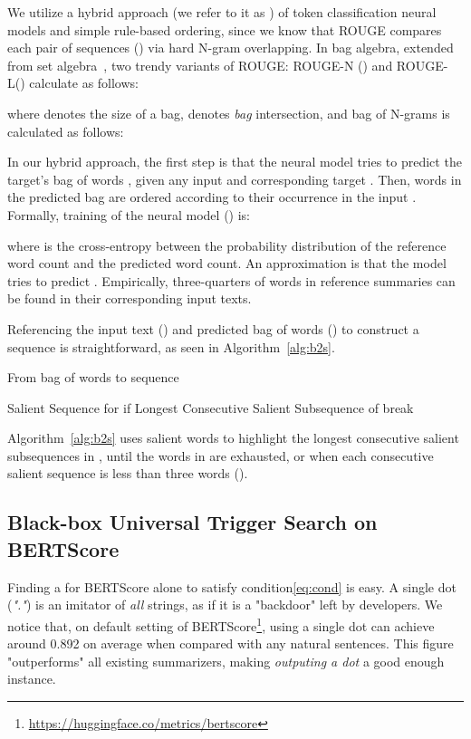 \documentclass[11pt]{article}
\theoremstyle{remark}
\begin{document}
We utilize a hybrid approach (we refer to it as ) of token classification neural models and simple rule-based ordering, since we know that ROUGE compares each pair of sequences () via hard N-gram overlapping. In bag algebra, extended from set algebra~\cite{bertossi2018datalog}, two trendy variants of ROUGE: ROUGE-N () and ROUGE-L() calculate as follows:



where  denotes the size of a bag,  denotes  \emph{bag} intersection, and bag of N-grams is calculated as follows:



In our hybrid approach, the first step is that the neural model tries to predict the target's bag of words , given any input  and corresponding target . Then, words in the predicted bag are ordered according to their occurrence in the input . Formally, training of the neural model () is:




where  is the cross-entropy between the probability distribution of the reference word count and the predicted word count. An approximation is that the model tries to predict . Empirically, three-quarters of words in reference summaries can be found in their corresponding input texts.

Referencing the input text () and predicted bag of words () to construct a sequence is straightforward, as seen in Algorithm~\ref{alg:b2s}.


\begin{algorithm}
\caption{From bag of words to sequence}\label{alg:b2s}
\small
\begin{algorithmic}
\Require 
\Return 
\State 
\While{}
\State Salient Sequence  for  if 
\State  Longest Consecutive Salient Subsequence of 
\If{} 
\State break 
\EndIf
\State  {}
\State  {}

\EndWhile
\end{algorithmic}
\end{algorithm}

Algorithm~\ref{alg:b2s} uses salient words to highlight the longest consecutive salient subsequences in , until the words in  are exhausted, or when each consecutive salient sequence is less than three words (). 


\subsection{Black-box Universal Trigger Search on BERTScore}
Finding a  for BERTScore alone to satisfy condition\ref{eq:cond} is easy. A single dot (\emph{"."}) is an imitator of \emph{all} strings, as if it is a "backdoor" left by developers. We notice that, on default setting of BERTScore\footnote{\url{https://huggingface.co/metrics/bertscore}}, using a single dot can achieve around 0.892 on average when compared with any natural sentences. This figure "outperforms" all existing summarizers, making \textit{outputing a dot} a good enough  instance.
\end{document}
